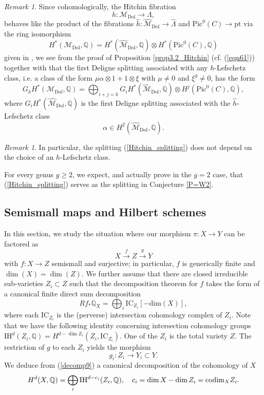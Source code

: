 \documentclass[11pt]{amsart}
\theoremstyle{plain}
\theoremstyle{definition}
\theoremstyle{remark}
\newtheorem{rmk}[thm]{Remark}
\newcommand{\BQ}{{\mathbb{Q}}}
\newcommand{\CM}{{\mathcal M}}
\begin{document}
\begin{rmk}
Since cohomologically, the Hitchin fibration 
\[
h: \CM_{\mathrm{Dol}} \to  \Lambda,
\]
behaves like the product of the fibrations $\hat{h}: \hat{\CM}_{\mathrm{Dol}} \to \hat{\Lambda}$ and $\mathrm{Pic}^0(C) \to \mathrm{pt}$ via the ring isomorphism
\[
H^*(\CM_{\mathrm{Dol}}, \BQ) =H^*(\hat{\CM}_{\mathrm{Dol}}, \BQ) \otimes H^*(\mathrm{Pic}^0(C), \BQ)
\]
given in \cite[Section 2.4]{dCHM1}, we see from the proof of Proposition \ref{prop3.2_Hitchin}
 {(cf. (\ref{eqn61}))} together with \cite[Appendix]{dC} that the first Deligne splitting associated with any 
$h$-Lefschetz class, i.e. a class of the form $\mu \alpha\otimes 1+ 1\otimes \xi$ with $\mu\neq 0$ and $\xi^g \neq 0$, has the form
\begin{equation}\label{Hitchin_splitting}
G_k H^*(\CM_{\mathrm{Dol}}, \BQ) = \bigoplus_{i+j=k} G_iH^*(\hat{\CM}_{\mathrm{Dol}}, \BQ) \otimes H^j(\mathrm{Pic}^0(C), \BQ), 
\end{equation}
where $G_iH^*(\hat{\CM}_{\mathrm{Dol}}, \BQ)$ is the first Deligne splitting associated with the $\hat{h}$-Lefschetz class 
\[
\alpha \in H^2(\hat{\CM}_{\mathrm{Dol}}, \BQ).
\]
\begin{rmk}\label{dolglcansplit}
In particular, the splitting (\ref{Hitchin_splitting}) does not depend on the choice of an  $h$-Lefschetz class.
\end{rmk}
For  every genus $g \geq 2$, we expect, and actually prove in the $g=2$ case, that (\ref{Hitchin_splitting}) serves as the splitting in Conjecture \ref{P=W2}.
\end{rmk}


\subsection{Semismall maps and Hilbert schemes}\label{Section3.4}
In this section, we study the situation where our morphism $\pi: X \to Y$ can be factored as
\[
X \xrightarrow{f} Z \xrightarrow{g} Y
\]
with $f: X \to Z$ semismall and surjective; in particular, $f$ is generically finite and $\dim (X)=\dim (Z)$. We further assume that there are closed irreducible sub-varieties $Z_i \subset Z$ such that the decomposition theorem for $f$ takes  the form of a canonical  finite direct sum decomposition
\begin{equation}\label{decomp9}
Rf_* \BQ_X = \bigoplus_i \mathrm{IC}_{Z_i}[-\mathrm{dim}(X)],
\end{equation}
where each $\mathrm{IC}_{Z_i}$ is the (perverse) intersection cohomology complex of $Z_i$. Note that we have the following identity concerning intersection cohomology groups
$\mathrm{IH}^d(Z_i, \BQ)=H^{d-\dim Z_i}(Z_i, \mathrm{IC}_{Z_i})$.
One of the $Z_i$ is the total variety $Z$. The restriction of $g$ to each $Z_i$ yields the morphism
\[
g_i: Z_i \to Y_i \subset Y.
\]
We deduce from (\ref{decomp9}) a canonical decomposition of the cohomology of $X$
\begin{equation}\label{decomp8}
H^d(X, \BQ) = \bigoplus_i \mathrm{IH}^{d-c_i}(Z_i, \BQ), {\quad c_i = \dim X - \dim Z_i={\rm codim}_X Z_i.}
\end{equation}
\end{document}
